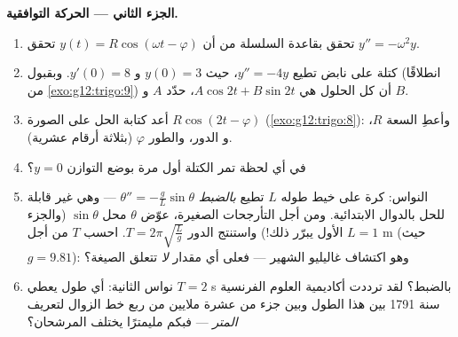 \begin{problem}
\medskip
\noindent\textbf{الجزء الثاني --- الحركة التوافقية.}
\begin{enumerate}[resume]
  \item تحقق بقاعدة السلسلة من أن
        $y(t) = R\cos(\omega t - \varphi)$ تحقق
        $y'' = -\omega^2 y$.
  \item كتلة على نابض تطيع $y'' = -4y$، حيث
        $y(0) = 3$ و $y'(0) = 8$. وبقبول (انطلاقًا من
        \cref{exo:g12:trigo:9}) أن كل الحلول هي
        $A\cos 2t + B\sin 2t$، حدّد $A$ و $B$.
  \item أعد كتابة الحل على الصورة $R\cos(2t - \varphi)$
        (\cref{exo:g12:trigo:8}): وأعطِ السعة $R$، و
        الدور، والطور $\varphi$ (بثلاثة أرقام عشرية).
  \item في أي لحظة تمر الكتلة أول مرة بوضع
        التوازن $y = 0$؟
  \item النواس: كرة على خيط طوله $L$ تطيع
        \emph{بالضبط} $\theta'' = -\frac gL \sin\theta$ ---
        وهي غير قابلة للحل بالدوال الابتدائية. ومن أجل التأرجحات الصغيرة،
        عوّض $\theta$ محل $\sin\theta$ (والجزء الأول يبرّر ذلك!)
        واستنتج الدور
        $T = 2\pi\sqrt{\frac Lg}$. احسب $T$ من أجل
        $L = 1$ m (حيث $g = 9.81$): وهو اكتشاف غاليليو الشهير ---
        فعلى أي مقدار \emph{لا} تتعلق الصيغة؟
  \item نواس الثانية: أي طول يعطي
        $T = 2$ s بالضبط؟ لقد ترددت أكاديمية العلوم الفرنسية سنة 1791
        بين هذا الطول وبين جزء من عشرة ملايين من
        ربع خط الزوال لتعريف \emph{المتر} --- فبكم
        مليمترًا يختلف المرشحان؟
\end{enumerate}


\end{problem}

